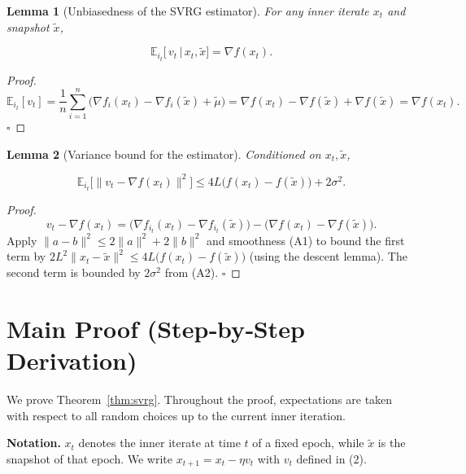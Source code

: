 \documentclass{article}
\newtheorem{lemma}{Lemma}
\newcommand{\E}{\mathbb{E}}
\begin{document}
\begin{lemma}[Unbiasedness of the SVRG estimator]\label{lem:unbiased}
For any inner iterate \(x_t\) and snapshot \(\tilde{x}\),

\[
\E_{i_t}\!\bigl[\,v_t\,\big|\,x_t,\tilde{x}\bigr] = \nabla f(x_t).
\tag{L2}
\]
\end{lemma}
\begin{proof}
\[
\E_{i_t}[v_t]=\frac1n\sum_{i=1}^{n}
\bigl(\nabla f_i(x_t)-\nabla f_i(\tilde{x})+\tilde{\mu}\bigr)
= \nabla f(x_t)-\nabla f(\tilde{x})+\nabla f(\tilde{x})
= \nabla f(x_t).
\] \(\square\)
\end{proof}

\begin{lemma}[Variance bound for the estimator]\label{lem:varbound}
Conditioned on \(x_t,\tilde{x}\),

\[
\E_{i_t}\!\bigl[\|v_t-\nabla f(x_t)\|^{2}\bigr]
\le 4L\bigl( f(x_t)-f(\tilde{x})\bigr) + 2\sigma^{2}.
\tag{L3}
\]
\end{lemma}
\begin{proof}
\[
v_t-\nabla f(x_t)=\bigl(\nabla f_{i_t}(x_t)-\nabla f_{i_t}(\tilde{x})\bigr)
                 -\bigl(\nabla f(x_t)-\nabla f(\tilde{x})\bigr).
\]
Apply \(\|a-b\|^{2}\le 2\|a\|^{2}+2\|b\|^{2}\) and smoothness (A1) to bound the first term by
\(2L^{2}\|x_t-\tilde{x}\|^{2}\le 4L\bigl(f(x_t)-f(\tilde{x})\bigr)\) (using the
descent lemma).  The second term is bounded by \(2\sigma^{2}\) from (A2). \(\square\)
\end{proof}

\section*{Main Proof (Step‑by‑Step Derivation)}
We prove Theorem~\ref{thm:svrg}.  Throughout the proof, expectations are taken
with respect to all random choices up to the current inner iteration.

\noindent\textbf{Notation.}  \(x_t\) denotes the inner iterate at time \(t\) of a
fixed epoch, while \(\tilde{x}\) is the snapshot of that epoch.
We write \(x_{t+1}=x_t-\eta v_t\) with \(v_t\) defined in (2).
\end{document}
